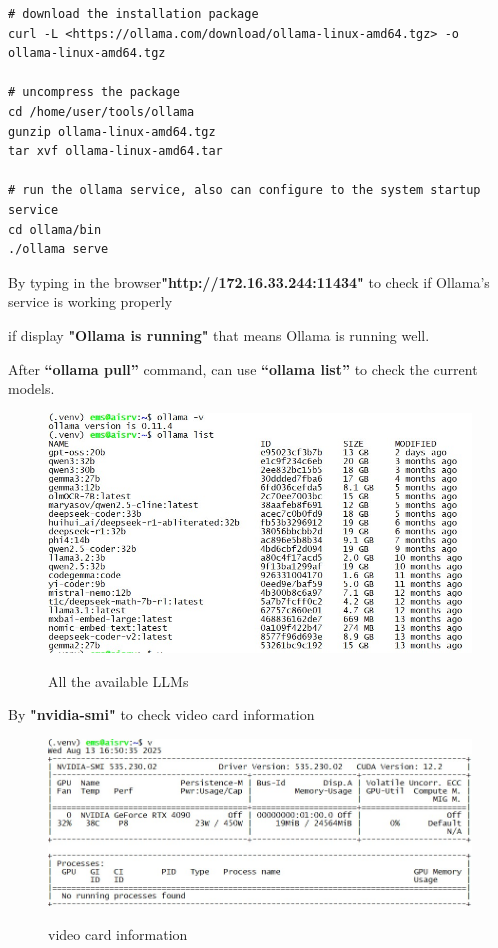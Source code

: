 \begin{lstlisting}
# download the installation package
curl -L <https://ollama.com/download/ollama-linux-amd64.tgz> -o ollama-linux-amd64.tgz

# uncompress the package
cd /home/user/tools/ollama
gunzip ollama-linux-amd64.tgz
tar xvf ollama-linux-amd64.tar

# run the ollama service, also can configure to the system startup service
cd ollama/bin
./ollama serve
\end{lstlisting}

By typing in the browser\textbf{"http://172.16.33.244:11434"} to check if Ollama's service is working properly  

if display \textbf{"Ollama is running" }that means Ollama is running well.

\shortdashline

After\textbf{ “ollama pull”} command, can use \textbf{“ollama list” }to check the current models.

\begin{figure}[H]
    \begin{center}
        \includegraphics[width=.95\linewidth]{res/ollama_list.jpg}\\
        \caption{ All the available LLMs}\label{ollama_list}
    \end{center}
\end{figure} 

\shortdashline

By \textbf{"nvidia-smi"} to check video card information

\begin{figure}[H]
    \begin{center}
        \includegraphics[width=.95\linewidth]{res/video_card_info.jpg}\\
        \caption{ video card information}\label{video_card_info}
    \end{center}
\end{figure} 

